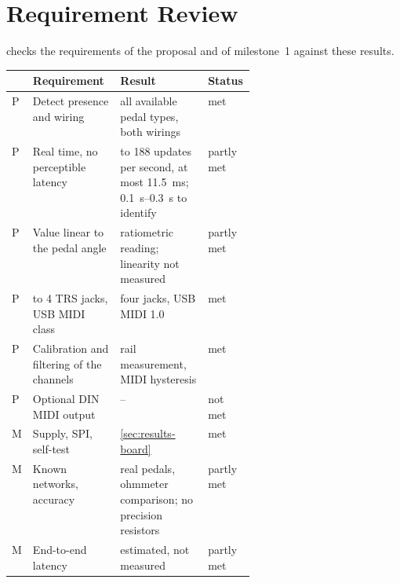 
\section{Requirement Review}
\label{sec:results-requirements}

 checks the requirements of the proposal \cite{benson2026proposal} and of milestone~1 against these results.

\begin{table}[tb]
  \centering
  \footnotesize
  \label{tab:requirements}
  \begin{tabularx}{\linewidth}{@{}l >{\raggedright\arraybackslash}p{0.36\linewidth} >{\raggedright\arraybackslash}X l@{}}
    \toprule
    & \textbf{Requirement} & \textbf{Result} & \textbf{Status} \\
    \midrule
    P & Detect presence and wiring & all available pedal types, both wirings & met \\
    P & Real time, no perceptible latency & 95 to 188 updates per second, at most \qty{11.5}{\milli\second}; \qtyrange{0.1}{0.3}{\second} to identify & partly met \\
    P & Value linear to the pedal angle & ratiometric reading; linearity not measured & partly met \\
    P & 1 to 4 TRS jacks, USB MIDI class & four jacks, USB MIDI 1.0 & met \\
    P & Calibration and filtering of the channels & rail measurement, MIDI hysteresis & met \\
    P & Optional DIN MIDI output & -- & not met \\
    M & Supply, SPI, self-test & \cref{sec:results-board} & met \\
    M & Known networks, accuracy & real pedals, ohmmeter comparison; no precision resistors & partly met \\
    M & End-to-end latency & estimated, not measured & partly met \\
    \bottomrule
  \end{tabularx}
\end{table}
